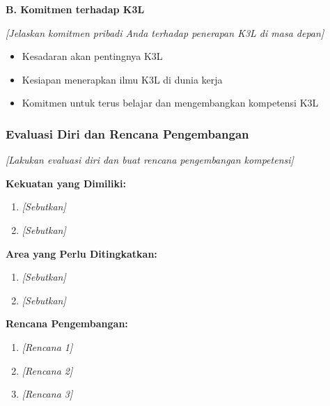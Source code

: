 \textbf{B. Komitmen terhadap K3L}

\textit{[Jelaskan komitmen pribadi Anda terhadap penerapan K3L di masa depan]}

\begin{itemize}
    \item Kesadaran akan pentingnya K3L
    \item Kesiapan menerapkan ilmu K3L di dunia kerja
    \item Komitmen untuk terus belajar dan mengembangkan kompetensi K3L
\end{itemize}

\vspace{0.5cm}

\subsubsection{Evaluasi Diri dan Rencana Pengembangan}

\textit{[Lakukan evaluasi diri dan buat rencana pengembangan kompetensi]}

\textbf{Kekuatan yang Dimiliki:}
\begin{enumerate}
    \item \textit{[Sebutkan]}
    \item \textit{[Sebutkan]}
\end{enumerate}

\textbf{Area yang Perlu Ditingkatkan:}
\begin{enumerate}
    \item \textit{[Sebutkan]}
    \item \textit{[Sebutkan]}
\end{enumerate}

\textbf{Rencana Pengembangan:}
\begin{enumerate}
    \item \textit{[Rencana 1]}
    \item \textit{[Rencana 2]}
    \item \textit{[Rencana 3]}
\end{enumerate}


